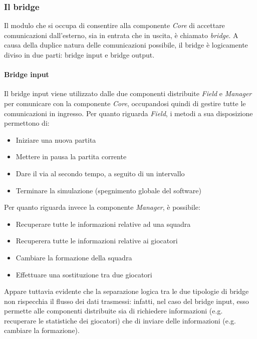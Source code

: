 \subsubsection{Il bridge}
\label{sec:analisi_distribuzione_bridge}

Il modulo che si occupa di consentire alla componente \textit{Core} di accettare comunicazioni dall'esterno, sia in entrata che in uscita, è chiamato \textit{bridge}. A causa della duplice natura delle comunicazioni possibile, il bridge è logicamente diviso in due parti: bridge input e bridge output.

\paragraph{Bridge input}\label{sec:analisi_distribuzione_bridge_input} Il bridge input viene utilizzato dalle due componenti distribuite \textit{Field} e \textit{Manager} per comunicare con la componente \textit{Core}, occupandosi quindi di gestire tutte le comunicazioni in ingresso. Per quanto riguarda \textit{Field}, i metodi a sua disposizione permettono di:

\begin{itemize}
	\item Iniziare una nuova partita
	\item Mettere in pausa la partita corrente
	\item Dare il via al secondo tempo, a seguito di un intervallo
	\item Terminare la simulazione (spegnimento globale del software)
\end{itemize}

\noindent Per quanto riguarda invece la componente \textit{Manager}, è possibile:

\begin{itemize}
	\item Recuperare tutte le informazioni relative ad una squadra
	\item Recuperera tutte le informazioni relative ai giocatori
	\item Cambiare la formazione della squadra
	\item Effettuare una sostituzione tra due giocatori
\end{itemize}

Appare tuttavia evidente che la separazione logica tra le due tipologie di bridge non rispecchia il flusso dei dati trasmessi: infatti, nel caso del bridge input, esso permette alle componenti distribuite sia di richiedere informazioni (e.g. recuperare le statistiche dei giocatori) che di inviare delle informazioni (e.g. cambiare la formazione).\\


